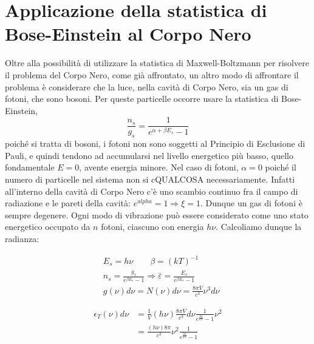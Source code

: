 
\section{Applicazione della statistica di Bose-Einstein al Corpo Nero}

Oltre alla possibilità di utilizzare la statistica di Maxwell-Boltzmann per risolvere il problema del Corpo Nero, come già affrontato,
un altro modo di affrontare il problema è considerare che la luce, nella cavità di Corpo Nero, sia un gas di fotoni, che sono bosoni.
Per queste particelle occorre usare la statistica di Bose-Einstein,
\begin{equation}
\frac{ n_s}{g_s } = \frac{ 1}{e^{ \alpha + \beta E_s } - 1 }
\end{equation}
poiché si tratta di bosoni, i fotoni non sono soggetti al Principio di Esclusione di Pauli, e quindi tendono ad accumularsi nel livello energetico più basso,
quello fondamentale $E=0$, avente energia minore.
Nel caso di fotoni, $\alpha = 0$ poiché il numero di particelle nel sistema non si cQUALCOSA necessariamente.
Infatti all'interno della cavità di Corpo Nero c'è uno scambio continuo fra il campo di radiazione e le pareti della cavità: $e^{ alpha } = 1 \Rightarrow \xi = 1$.
Dunque un gas di fotoni è sempre degenere.
Ogni modo di vibrazione può essere considerato come uno stato energetico occupato da $n$ fotoni, ciascuno con energia $h \nu$.
Calcoliamo dunque la radianza:

\begin{equation}
\begin{split}
& E_s = h \nu \quad \quad \beta = (kT)^{ -1 } \\
& n_s = \frac{ g_s}{e^{ \beta E_s } - 1 } \Rightarrow \bar \varepsilon = \frac{ E_s}{e^{\beta E_s } - 1 } \\
& g(\nu) d\nu = N(\nu)d\nu = \frac{ 8 \pi V}{c^3 } \nu^3 d\nu
\end{split}
\end{equation}

\begin{equation}
\begin{split}
\epsilon_T(\nu) d\nu & = \frac{ 1}{V } (h\nu) \frac{ 8 \pi V}{c^3 }d\nu \frac{ 1}{e^{ \frac{ h\nu}{kT } } - 1 }\nu^2 \\
& = \frac{ (h\nu) 8 \pi}{c^3} \nu^2 \frac{ 1}{e^{ \frac{ h\nu}{kT } } - 1 }
\end{split}
\end{equation}


